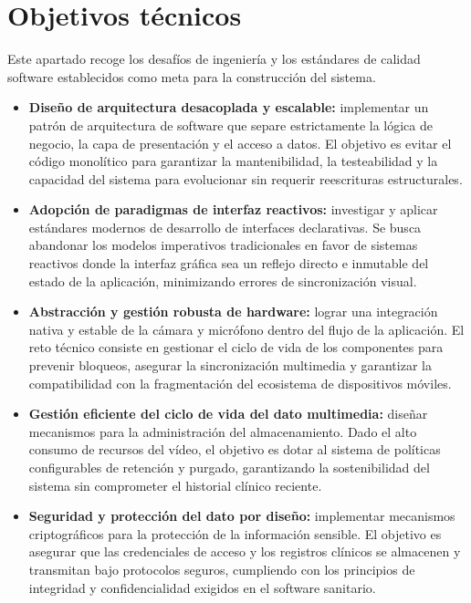 \section{Objetivos técnicos}

Este apartado recoge los desafíos de ingeniería y los estándares de calidad software establecidos como meta para la construcción del sistema.

\begin{itemize}
    \item \textbf{Diseño de arquitectura desacoplada y escalable:} implementar un patrón de arquitectura de software que separe estrictamente la lógica de negocio, la capa de presentación y el acceso a datos. El objetivo es evitar el código monolítico para garantizar la mantenibilidad, la testeabilidad y la capacidad del sistema para evolucionar sin requerir reescrituras estructurales.

    \item \textbf{Adopción de paradigmas de interfaz reactivos:} investigar y aplicar estándares modernos de desarrollo de interfaces declarativas. Se busca abandonar los modelos imperativos tradicionales en favor de sistemas reactivos donde la interfaz gráfica sea un reflejo directo e inmutable del estado de la aplicación, minimizando errores de sincronización visual.

    \item \textbf{Abstracción y gestión robusta de hardware:} lograr una integración nativa y estable de la cámara y micrófono dentro del flujo de la aplicación. El reto técnico consiste en gestionar el ciclo de vida de los componentes para prevenir bloqueos, asegurar la sincronización multimedia y garantizar la compatibilidad con la fragmentación del ecosistema de dispositivos móviles.

    \item \textbf{Gestión eficiente del ciclo de vida del dato multimedia:} diseñar mecanismos para la administración del almacenamiento. Dado el alto consumo de recursos del vídeo, el objetivo es dotar al sistema de políticas configurables de retención y purgado, garantizando la sostenibilidad del sistema sin comprometer el historial clínico reciente.

    \item \textbf{Seguridad y protección del dato por diseño:} implementar mecanismos criptográficos para la protección de la información sensible. El objetivo es asegurar que las credenciales de acceso y los registros clínicos se almacenen y transmitan bajo protocolos seguros, cumpliendo con los principios de integridad y confidencialidad exigidos en el software sanitario.
\end{itemize}


